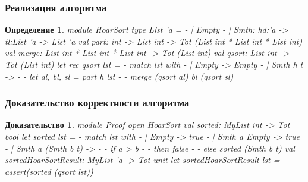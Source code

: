 \documentclass{beamer}
\newtheorem{ruproof}{Доказательство}
\newtheorem{rudefinition}{Определение}
\begin{document}
\begin{frame}
  \transwipe[direction=90]
  \frametitle{Реализация алгоритма}
  \begin{rudefinition}
    module HoarSort\linebreak
    type List 'a =\linebreak
     - | Empty\linebreak
     - | Smth: hd:'a -> tl:List 'a -> List 'a\linebreak
    val part: int -> List int -> Tot (List int * List int * List int)\linebreak
    val merge: List int * List int * List int -> Tot (List int)\linebreak
    val qsort: List int -> Tot (List int)\linebreak
    let rec qsort lst =\linebreak
     - match lst with\linebreak
     - | Empty -> Empty\linebreak
     - | Smth h t ->\linebreak
     -  - let al, bl, sl = part h lst\linebreak
     -  - merge (qsort al) bl (qsort sl)\linebreak
  \end{rudefinition}
\end{frame}

\begin{frame}
  \transwipe[direction=90]
  \frametitle{Доказательство корректности алгоритма}
  \begin{ruproof}
    module Proof\linebreak
    open HoarSort\linebreak
    val sorted: MyList int -> Tot bool\linebreak
    let sorted lst =\linebreak
     - match lst with\linebreak
     - | Empty -> true\linebreak
     - | Smth a Empty -> true\linebreak
     - | Smth a (Smth b t) ->\linebreak
     -  - if a > b\linebreak
     -  - then false\linebreak
     -  - else sorted (Smth b t)\linebreak
    val sortedHoarSortResult: MyList 'a -> Tot unit\linebreak
    let sortedHoarSortResult lst =\linebreak
     - assert(sorted (qsort lst)) \linebreak
  \end{ruproof}
\end{frame}
\end{document}
